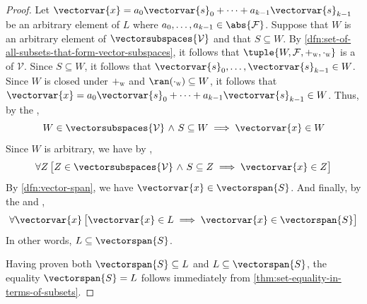 \begin{proof}
    \vspace{0.1cm}
    \noindent
    Let \( \vectorvar{x} = a_{0}\vectorvar{s}_{0} + \cdots + a_{k-1}\vectorvar{s}_{k-1} \) be an arbitrary element of \( L \) where
    \( a_{0},\dots,a_{k-1} \in \abs{\mathcal{F}} \).
    Suppose that \( W \) is an arbitrary element of \( \vectorsubspaces{\mathcal{V}} \) and that \( S \subseteq W \).
    By \cref{dfn:set-of-all-subsets-that-form-vector-subspaces}, it follows that \( \tuple{W, \mathcal{F}, \smallsubscript{+}{W}, \smallsubscript{\cdot}{W}} \)
    is a  of \( \mathcal{V} \).
    Since \( S \subseteq W \), it follows that \( \vectorvar{s}_{0}, \dots, \vectorvar{s}_{k-1} \in W \).
    Since \( W \) is closed under \( \smallsubscript{+}{W} \) and \( \ran (\smallsubscript{\cdot}{W}) \subseteq W \), it follows that
    \( \vectorvar{x} = a_{0}\vectorvar{s}_{0} + \cdots + a_{k-1}\vectorvar{s}_{k-1} \in W \).
    Thus, by the ,
    \begin{equation*}
        W \in \vectorsubspaces{\mathcal{V}} \,\,{\land}\,\, S \subseteq W \implies \vectorvar{x} \in W
    \end{equation*}
    Since \( W \) is arbitrary, we have by ,
    \begin{equation*}
        \forall Z \, \big[ Z \in \vectorsubspaces{\mathcal{V}} \,\,{\land}\,\, S \subseteq Z \implies \vectorvar{x} \in Z \big]
    \end{equation*}
    By \cref{dfn:vector-span}, we have \( \vectorvar{x} \in \vectorspan{S} \). And finally, by the 
    and ,
    \begin{equation*}
        \forall \vectorvar{x} \, \big[ \vectorvar{x} \in L \implies \vectorvar{x} \in \vectorspan{S} \big]\\
    \end{equation*}
    In other words, \( L \subseteq \vectorspan{S} \).

    \vspace{0.3cm}
    \noindent
    Having proven both \( \vectorspan{S} \subseteq L \) and \( L \subseteq \vectorspan{S} \), the equality \( \vectorspan{S} = L \) follows immediately from
    \cref{thm:set-equality-in-terms-of-subsets}.
\end{proof}

